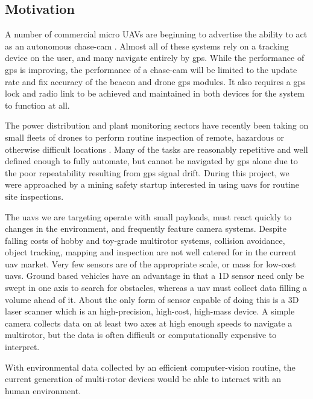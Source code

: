 \documentclass[a4paper, 11pt, titlepage]{article}
\begin{document}
    \subsection{Motivation}

      A number of commercial micro UAVs are beginning to advertise the ability to act as an autonomous chase-cam \cite{Lily} \cite{AirDog}.  Almost all of these systems rely on a tracking device on the user, and many navigate entirely by \gls{gps}.  While the performance of \gls{gps} is improving, the performance of a chase-cam will be limited to the update rate and fix accuracy of the beacon and drone \gls{gps} modules.  It also requires a \gls{gps} lock and radio link to be achieved and maintained in both devices for the system to function at all.

      The power distribution and plant monitoring sectors have recently been taking on small fleets of drones to perform routine inspection of remote, hazardous or otherwise difficult locations \cite{RopeAccess}.  Many of the tasks are reasonably repetitive and well defined enough to fully automate, but cannot be navigated by \gls{gps} alone due to the poor repeatability resulting from \gls{gps} signal drift.
      During this project, we were approached by a mining safety startup interested in using \glspl{uav} for routine site inspections.

      The \glspl{uav} we are targeting operate with small payloads, must react quickly to changes in the environment, and frequently feature camera systems.
      Despite falling costs of hobby and toy-grade multirotor systems, collision avoidance, object tracking, mapping and inspection are not well catered for in the current \gls{uav} market.
      Very few sensors are of the appropriate scale, or mass for low-cost \glspl{uav}.
      Ground based vehicles have an advantage in that a 1D sensor need only be swept in one axis to search for obstacles, whereas a \gls{uav} must collect data filling a volume ahead of it. About the only form of sensor capable of doing this is a 3D laser scanner which is an high-precision, high-cost, high-mass device.
      A simple camera collects data on at least two axes at high enough speeds to navigate a multirotor, but the data is often difficult or computationally expensive to interpret.

      With environmental data collected by an efficient computer-vision routine, the current generation of multi-rotor devices would be able to interact with an human environment.
\end{document}
